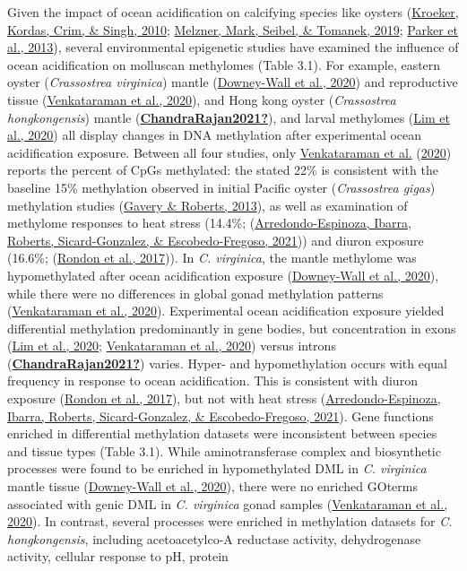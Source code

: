 \documentclass [11pt, proquest] {uwthesis}[2015/03/03]
\begin{document}
Given the impact of ocean acidification on calcifying species like oysters (\protect\hyperlink{ref-Kroeker2010}{Kroeker, Kordas, Crim, \& Singh, 2010}; \protect\hyperlink{ref-Melzner2019}{Melzner, Mark, Seibel, \& Tomanek, 2019}; \protect\hyperlink{ref-Parker2013}{Parker et al., 2013}), several environmental epigenetic studies have examined the influence of ocean acidification on molluscan methylomes (Table 3.1). For example, eastern oyster (\emph{Crassostrea virginica}) mantle (\protect\hyperlink{ref-Downey-Wall2020}{Downey-Wall et al., 2020}) and reproductive tissue (\protect\hyperlink{ref-Venkataraman2020}{Venkataraman et al., 2020}), and Hong kong oyster (\emph{Crassostrea hongkongensis}) mantle (\protect\hyperlink{ref-ChandraRajan2021}{\textbf{ChandraRajan2021?}}), and larval methylomes (\protect\hyperlink{ref-Lim2020}{Lim et al., 2020}) all display changes in DNA methylation after experimental ocean acidification exposure. Between all four studies, only \protect\hyperlink{ref-Venkataraman2020}{Venkataraman et al.} (\protect\hyperlink{ref-Venkataraman2020}{2020}) reports the percent of CpGs methylated: the stated 22\% is consistent with the baseline 15\% methylation observed in initial Pacific oyster (\emph{Crassostrea gigas}) methylation studies (\protect\hyperlink{ref-Gavery2013}{Gavery \& Roberts, 2013}), as well as examination of methylome responses to heat stress (14.4\%; (\protect\hyperlink{ref-Arredondo-Espinoza2021}{Arredondo-Espinoza, Ibarra, Roberts, Sicard-Gonzalez, \& Escobedo-Fregoso, 2021})) and diuron exposure (16.6\%; (\protect\hyperlink{ref-Rondon2017}{Rondon et al., 2017})). In \emph{C. virginica}, the mantle methylome was hypomethylated after ocean acidification exposure (\protect\hyperlink{ref-Downey-Wall2020}{Downey-Wall et al., 2020}), while there were no differences in global gonad methylation patterns (\protect\hyperlink{ref-Venkataraman2020}{Venkataraman et al., 2020}). Experimental ocean acidification exposure yielded differential methylation predominantly in gene bodies, but concentration in exons (\protect\hyperlink{ref-Lim2020}{Lim et al., 2020}; \protect\hyperlink{ref-Venkataraman2020}{Venkataraman et al., 2020}) versus introns (\protect\hyperlink{ref-ChandraRajan2021}{\textbf{ChandraRajan2021?}}) varies. Hyper- and hypomethylation occurs with equal frequency in response to ocean acidification. This is consistent with diuron exposure (\protect\hyperlink{ref-Rondon2017}{Rondon et al., 2017}), but not with heat stress (\protect\hyperlink{ref-Arredondo-Espinoza2021}{Arredondo-Espinoza, Ibarra, Roberts, Sicard-Gonzalez, \& Escobedo-Fregoso, 2021}). Gene functions enriched in differential methylation datasets were inconsistent between species and tissue types (Table 3.1). While aminotransferase complex and biosynthetic processes were found to be enriched in hypomethylated DML in \emph{C. virginica} mantle tissue (\protect\hyperlink{ref-Downey-Wall2020}{Downey-Wall et al., 2020}), there were no enriched GOterms associated with genic DML in \emph{C. virginica} gonad samples (\protect\hyperlink{ref-Venkataraman2020}{Venkataraman et al., 2020}). In contrast, several processes were enriched in methylation datasets for \emph{C. hongkongensis}, including acetoacetylco-A reductase activity, dehydrogenase activity, cellular response to pH, protein 
\end{document}
